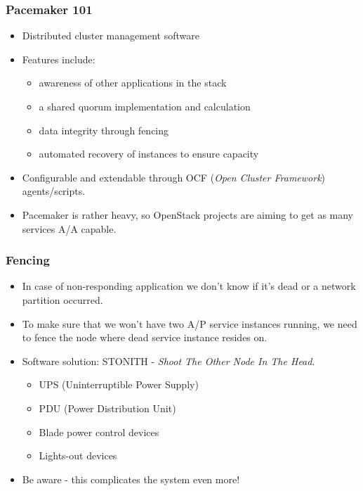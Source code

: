 \documentclass[aspectratio=43]{beamer}
\begin{document}
\begin{frame}
    \frametitle{Pacemaker 101}
    \begin{itemize}
        \item Distributed cluster management software
        \item Features include:
        \begin{itemize}
            \item awareness of other applications in the stack
            \item a shared quorum implementation and calculation
            \item data integrity through fencing
            \item automated recovery of instances to ensure capacity
        \end{itemize}
        \item Configurable and extendable through OCF (\emph{Open Cluster Framework}) agents/scripts.
        \item Pacemaker is rather heavy, so OpenStack projects are aiming to get as many services A/A capable.
    \end{itemize}
\end{frame}

\begin{frame}
    \frametitle{Fencing}
    \begin{itemize}
        \item In case of non-responding application we don't know if it's dead or a network partition occurred.
        \item To make sure that we won't have two A/P service instances running, we need to fence the node where dead service instance resides on.
        \pause
        \item Software solution: STONITH - \emph{Shoot The Other Node In The Head}.
        \begin{itemize}
            \item UPS (Uninterruptible Power Supply)
            \item PDU (Power Distribution Unit)
            \item Blade power control devices
            \item Lights-out devices
        \end{itemize}
        \item Be aware - this complicates the system even more!
    \end{itemize}
\end{frame}
\end{document}

